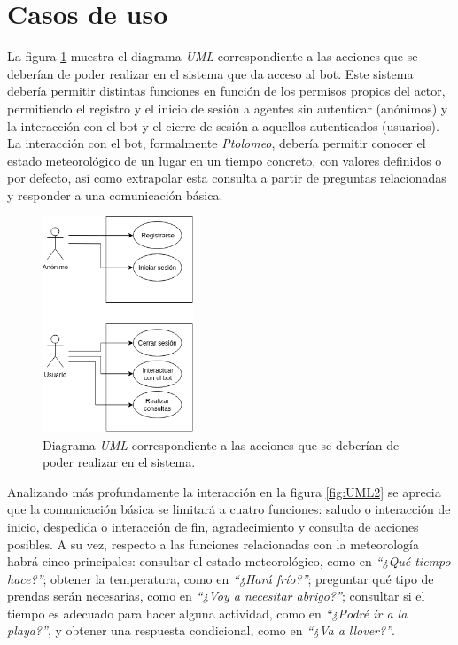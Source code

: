 \documentclass[11pt,spanish,listoffigures]{tfgetsinf}
\begin{document}

\section{Casos de uso}
\label{sec:casos-uso}

La figura \ref{fig:UML1} muestra el diagrama \textit{UML} correspondiente a las acciones que se deberían de poder realizar en el sistema que da acceso al bot. Este sistema debería permitir distintas funciones en función de los permisos propios del actor, permitiendo el registro y el inicio de sesión a agentes sin autenticar (anónimos) y la interacción con el bot y el cierre de sesión a aquellos autenticados (usuarios). La interacción con el bot, formalmente \textit{Ptolomeo}, debería permitir conocer el estado meteorológico de un lugar en un tiempo concreto, con valores definidos o por defecto, así como extrapolar esta consulta a partir de preguntas relacionadas y responder a una comunicación básica.

\begin{figure}[h!]
    \centering
    \includegraphics[width=0.4\textwidth]{images/img03.png}
    \caption{Diagrama \textit{UML} correspondiente a las acciones que se deberían de poder realizar en el sistema.}
    \label{fig:UML1}
\end{figure}

Analizando más profundamente la interacción en la figura \ref{fig:UML2} se aprecia que la comunicación básica se limitará a cuatro funciones: saludo o interacción de inicio, despedida o interacción de fin, agradecimiento y consulta de acciones posibles. A su vez, respecto a las funciones relacionadas con la meteorología habrá cinco principales: consultar el estado meteorológico, como en \textit{“¿Qué tiempo hace?”}; obtener la temperatura, como en  \textit{“¿Hará frío?”}; preguntar qué tipo de prendas serán necesarias, como en \textit{“¿Voy a necesitar abrigo?”}; consultar si el tiempo es adecuado para hacer alguna actividad, como en \textit{“¿Podré ir a la playa?”}, y obtener una respuesta condicional, como en \textit{“¿Va a llover?”}. 
\end{document}
